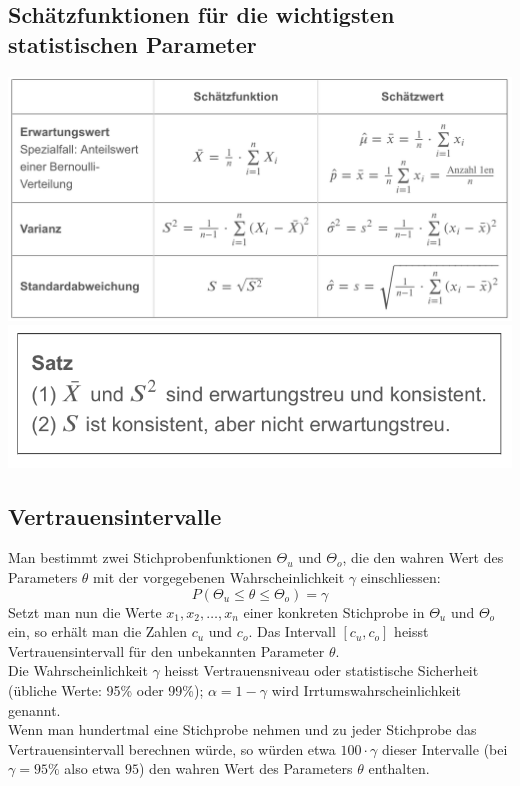 \subsection{Schätzfunktionen für die wichtigsten statistischen Parameter}
\label{sec:schaetzfunktionen_fuer_die_wichtigsten_statistischen_parameter}
\begin{center}
    \includegraphics[width=1\linewidth]{images/schaetzfunktionen}
    \includegraphics[width=0.5\linewidth]{images/schaetzfunktionen2}
\end{center}
\subsection{Vertrauensintervalle}
\label{sec:vertrauensintervalle}
Man bestimmt zwei Stichprobenfunktionen $\Theta_u$ und $\Theta_o$, die den wahren Wert des Parameters $\theta$ mit der vorgegebenen Wahrscheinlichkeit
$\gamma$ einschliessen: 
\begin{equation*}
    P(\Theta_u \leq \theta \leq \Theta_o) = \gamma
\end{equation*}
Setzt man nun die Werte $x_1,x_2,\dots,x_n$ einer konkreten Stichprobe in $\Theta_u$ und $\Theta_o$ ein, so erhält man die Zahlen $c_u$ und $c_o$.
Das Intervall $[c_u,c_o]$ heisst Vertrauensintervall für den unbekannten Parameter $\theta$. \\
Die Wahrscheinlichkeit $\gamma$ heisst Vertrauensniveau oder statistische Sicherheit (übliche Werte: 95\% oder 99\%);
$\alpha = 1 - \gamma$ wird Irrtumswahrscheinlichkeit genannt. \\
Wenn man hundertmal eine Stichprobe nehmen und zu jeder Stichprobe das Vertrauensintervall berechnen würde, so würden etwa $100 \cdot \gamma$
dieser Intervalle (bei $\gamma = 95\%$ also etwa $95$) den wahren Wert des Parameters $\theta$ enthalten. \\
